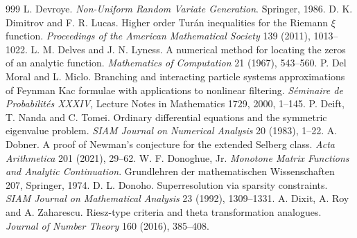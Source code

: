 \begin{thebibliography}{999}
 L. Devroye. \emph{Non-Uniform Random Variate Generation}. Springer, 1986.
 D. K. Dimitrov and F. R. Lucas. Higher order Tur\'an inequalities for the Riemann $\xi$ function. \emph{Proceedings of the American Mathematical Society} 139 (2011), 1013--1022.
 L. M. Delves and J. N. Lyness. A numerical method for locating the zeros of an analytic function. \emph{Mathematics of Computation} 21 (1967), 543--560.
 P. Del Moral and L. Miclo. Branching and interacting particle systems approximations of Feynman Kac formulae with applications to nonlinear filtering. \emph{S\'eminaire de Probabilit\'es XXXIV}, Lecture Notes in Mathematics 1729, 2000, 1--145.
 P. Deift, T. Nanda and C. Tomei. Ordinary differential equations and the symmetric eigenvalue problem. \emph{SIAM Journal on Numerical Analysis} 20 (1983), 1--22.
 A. Dobner. A proof of Newman's conjecture for the extended Selberg class. \emph{Acta Arithmetica} 201 (2021), 29--62.
 W. F. Donoghue, Jr. \emph{Monotone Matrix Functions and Analytic Continuation}. Grundlehren der mathematischen Wissenschaften 207, Springer, 1974.
 D. L. Donoho. Superresolution via sparsity constraints. \emph{SIAM Journal on Mathematical Analysis} 23 (1992), 1309--1331.
 A. Dixit, A. Roy and A. Zaharescu. Riesz-type criteria and theta transformation analogues. \emph{Journal of Number Theory} 160 (2016), 385--408.


\end{thebibliography}
